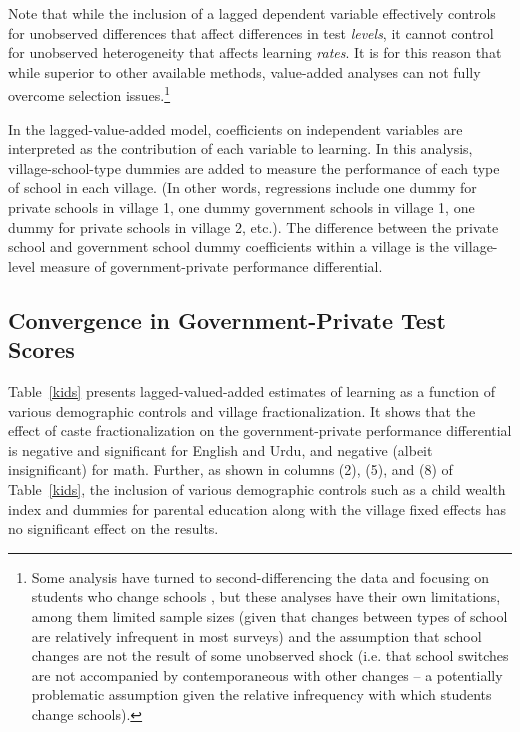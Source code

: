 \documentclass[Eubank_pk_ethnic_sorting.tex]{subfiles}
\begin{document}
Note that while the inclusion of a lagged dependent variable effectively controls for unobserved differences that affect differences in test \emph{levels}, it cannot control for unobserved heterogeneity that affects learning \emph{rates}. It is for this reason that while superior to other available methods, value-added analyses can not fully overcome selection issues.\footnote{Some analysis have turned to second-differencing the data and focusing on students who change schools \citep{Andrabi:2011hl}, but these analyses have their own limitations, among them limited sample sizes (given that changes between types of school are relatively infrequent in most surveys) and the assumption that school changes are not the result of some unobserved shock (i.e. that school switches are not accompanied by contemporaneous with other changes -- a potentially problematic assumption given the relative infrequency with which students change schools).}

In the lagged-value-added model, coefficients on independent variables are interpreted as the contribution of each variable to learning. In this analysis, village-school-type dummies are added to measure the performance of each type of school in each village. (In other words, regressions include one dummy for private schools in village 1, one dummy government schools in village 1, one dummy for private schools in village 2, etc.). The difference between the private school and government school dummy coefficients within a village is the village-level measure of government-private performance differential. 

\subsection{Convergence in Government-Private Test Scores}\label{}


Table~\ref{kids} presents lagged-valued-added estimates of learning as a function of various demographic controls and village fractionalization. It shows that the effect of caste fractionalization on the government-private performance differential is negative and significant for English and Urdu, and negative (albeit insignificant) for math. Further, as shown in columns (2), (5), and (8) of Table~\ref{kids}, the inclusion of various demographic controls such as a child wealth index and dummies for parental education along with the village fixed effects has no significant effect on the results. 


\end{document}
